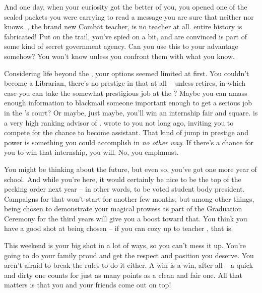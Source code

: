 \documentclass[char]{GL2020}
\begin{document}
And one day, when your curiosity got the better of you, you opened one of the sealed packets you were carrying to read a message you are sure that neither \cEthics{} nor \cChupSecond{} knows. \cInterpol{}, the brand new Combat teacher, is no teacher at all. \cInterpol{\Their} entire history is fabricated! Put on the trail, you’ve spied on \cInterpol{} a bit, and are convinced \cInterpol{} is part of some kind of secret government agency. Can you use this to your advantage somehow? You won’t know unless you confront them with what you know.

Considering life beyond the \pSc{}, your options seemed limited at first. You couldn’t become a Librarian, there’s no prestige in that at all -- unless \cLibrarian{} retires, in which case you can take the somewhat prestigious job at the \pSc{}? Maybe you can amass enough information to blackmail someone important enough to get a serious job in the \cQueen{\Majesty}’s court? Or maybe, just maybe, you’ll win an internship fair and square. \cEvil{} is a very high ranking advisor of \cQueen{\Majesty} \cQueen{}. \cEvil{\They} wrote to you not long ago, inviting you to compete for the chance to become \cEvil{\their} assistant. That kind of jump in prestige and power is something you could accomplish in \emph{no other way}. If there’s a chance for you to win that internship, you will. No, you emph{must}.

You might be thinking about the future, but even so, you’ve got one more year of school. And while you’re here, it would certainly be nice to be the top of the pecking order next year -- in other words, to be voted student body president. Campaigns for that won’t start for another few months, but among other things, being chosen to demonstrate your magical prowess as part of the Graduation Ceremony for the third years will give you a boost toward that. You think you have a good shot at being chosen -- if you can cozy up to teacher \cMusic{}, that is.

This weekend is your big shot in a lot of ways, so you can’t mess it up. You’re going to do your family proud and get the respect and position you deserve. You aren’t afraid to break the rules to do it either. A win is a win, after all -- a quick and dirty one counts for just as many points as a clean and fair one. All that matters is that you and your friends come out on top!
\end{document}
